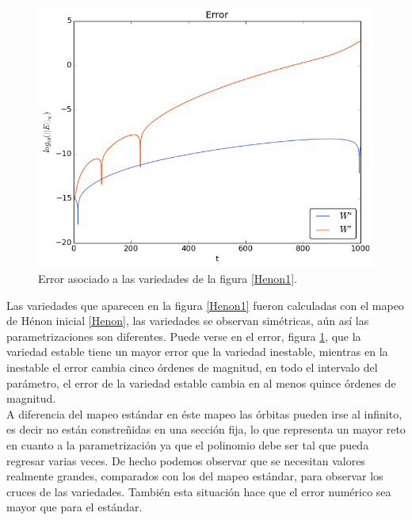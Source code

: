\begin{figure}[H]
\centering
\includegraphics[scale=0.6]{ErrorHenon1}
\caption{Error asociado a las variedades de la figura \ref{Henon1}.}
\label{ErrorHenon1}
\end{figure}
Las variedades que aparecen en la figura \ref{Henon1} fueron calculadas con el mapeo de Hénon inicial \ref{Henon}, las variedades se observan simétricas, aún así las parametrizaciones son diferentes. Puede verse en el error, figura \ref{ErrorHenon1}, que la variedad estable tiene un mayor error que la variedad inestable, mientras en la inestable el error cambia cinco órdenes de magnitud, en todo el intervalo del parámetro, el error de la variedad estable cambia en al menos quince órdenes de magnitud. \\

A diferencia del mapeo estándar en éste mapeo las órbitas pueden irse al infinito, es decir no están  constreñidas en una sección fija, lo que representa un mayor reto en cuanto a la parametrización ya que el polinomio debe ser tal que pueda regresar varias veces. De hecho podemos observar que se necesitan valores realmente grandes, comparados con los del mapeo estándar, para observar los cruces de las variedades. También esta situación hace que el error numérico sea mayor que para el estándar. \\

